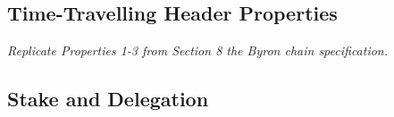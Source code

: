 




\subsection{Time-Travelling Header Properties}

\emph{Replicate Properties 1-3 from Section 8 the Byron chain specification.}


\subsection{Stake and Delegation}

